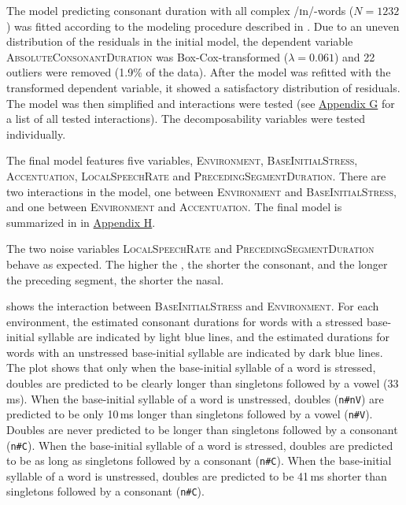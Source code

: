The model predicting consonant duration with all complex /ɪn/-words ($N=1232$) was fitted according to the modeling procedure described in . Due to an uneven distribution of the residuals in the initial model, the dependent variable \textsc{AbsoluteConsonantDuration} was Box-Cox-transformed ($\lambda = 0.061$) and 22 outliers were removed (1.9\% of the data).
After the model was refitted with the transformed dependent variable, it showed a satisfactory distribution of residuals.  The model was then simplified and interactions were tested (see \hyperref[Appendix G Summaries of tested interactions in experimental study]{Appendix G} for a list of all tested interactions).
The decomposability variables were tested individually.

The final model features five variables, \textsc{Environment}, \textsc{BaseInitialStress}, \textsc{Accentuation}, \textsc{LocalSpeechRate} and \textsc{PrecedingSegmentDuration}. 
There are two interactions in the model, one between \textsc{Environment} and \textsc{BaseInitialStress}, and one between \textsc{Environment} and \textsc{Accentuation}. The final model is summarized in  in \hyperref[Appendix H: Model Summaries Experiment]{Appendix H}.


The two noise variables \textsc{LocalSpeechRate} and \textsc{PrecedingSegmentDuration} behave as expected. The higher the , the shorter the consonant, and the longer the preceding segment, the shorter the nasal. 


 shows the interaction between \textsc{BaseInitialStress} and \textsc{Environment}. For each environment, the estimated consonant durations for words with a stressed base-initial syllable are indicated by light blue lines, and the estimated durations for words with an unstressed base-initial syllable are indicated by dark blue lines. 
The plot shows that only when the base-initial syllable of a word is stressed, doubles are predicted to be clearly longer than singletons followed by a vowel (33\,ms). When the base-initial syllable of a word is unstressed, doubles (\texttt{n\#nV}) are predicted to be only 10\,ms longer than singletons followed by a vowel (\texttt{n\#V}).
Doubles are never predicted to be longer than singletons followed by a consonant  (\texttt{n\#C}).
When the base-initial syllable of a word is stressed, doubles are predicted to be as long as singletons followed by a consonant (\texttt{n\#C}). When the base-initial syllable of a word is unstressed, doubles are predicted to be 41\,ms shorter than singletons followed by a consonant (\texttt{n\#C}).





